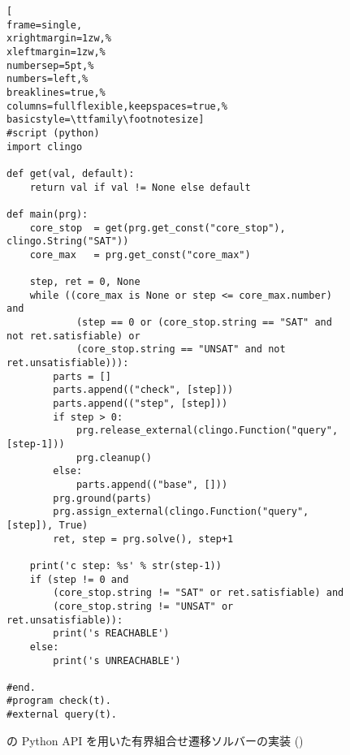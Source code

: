 

% 

\begin{figure*}[t]
\centering  
\begin{lstlisting}[
frame=single,
xrightmargin=1zw,% 
xleftmargin=1zw,% 
numbersep=5pt,%
numbers=left,%
breaklines=true,%
columns=fullflexible,keepspaces=true,%
basicstyle=\ttfamily\footnotesize]
#script (python) 
import clingo

def get(val, default):
    return val if val != None else default

def main(prg):
    core_stop  = get(prg.get_const("core_stop"), clingo.String("SAT"))
    core_max   = prg.get_const("core_max")

    step, ret = 0, None
    while ((core_max is None or step <= core_max.number) and
            (step == 0 or (core_stop.string == "SAT" and not ret.satisfiable) or
            (core_stop.string == "UNSAT" and not ret.unsatisfiable))):    
        parts = []
        parts.append(("check", [step]))
        parts.append(("step", [step]))
        if step > 0:
            prg.release_external(clingo.Function("query", [step-1]))
            prg.cleanup()
        else:
            parts.append(("base", []))
        prg.ground(parts)
        prg.assign_external(clingo.Function("query", [step]), True)
        ret, step = prg.solve(), step+1

    print('c step: %s' % str(step-1))
    if (step != 0 and
        (core_stop.string != "SAT" or ret.satisfiable) and
        (core_stop.string != "UNSAT" or ret.unsatisfiable)):
        print('s REACHABLE')
    else:
        print('s UNREACHABLE')

#end.
#program check(t).
#external query(t).
\end{lstlisting}
\caption{{\clingo}の Python API を用いた有界組合せ遷移ソルバーの実装 ()}
\label{code:core.lp}
\end{figure*}

